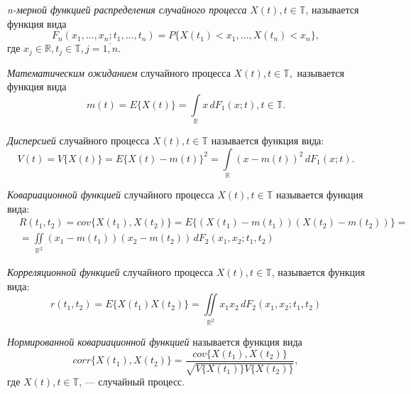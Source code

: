 \begin{Definition}
\label{def:distr_func}
	\textit{n-мерной функцией распределения случайного процесса} $ X(t), t \in \mathbb{T} $, называется функция вида
	\begin{equation*}
		F_n(x_1, \dots, x_n; t_1, \dots, t_n) = P \{ X(t_1) < x_1, \dots, X(t_n) < x_n \},
	\end{equation*}
	где $ x_j \in \mathbb{R}, t_j \in \mathbb{T}, j = \overline{1,n} $.
\end{Definition}

\begin{Definition}
	\textit{Математическим ожиданием} случайного процесса $ X(t), t \in \mathbb{T}, $ называется функция вида
	\begin{equation*}
		m(t) = E \{ X(t) \} = \int \limits_{\mathbb{R}} x \, dF_1(x;t), t \in \mathbb{T}.
	\end{equation*}
\end{Definition}

\begin{Definition}
	\textit{Дисперсией} случайного процесса $ X(t), t \in \mathbb{T} $ называется функция вида:
	\begin{equation*}
		V(t) = V \{ X(t) \} = E \{ X(t) - m(t) \}^2 = \int \limits_{\mathbb{R}} (x - m(t))^2 \, dF_1(x; t).
	\end{equation*}
\end{Definition}

\begin{Definition}
	\textit{Ковариационной функцией} случайного процесса $ X(t), t \in \mathbb{T} $ называется функция вида:
	\begin{eqnarray*}
		& R(t_1, t_2) = cov\{ X(t_1), X(t_2) \} = E \{ (X(t_1) - m(t_1)) (X(t_2) - m(t_2)) \} = \\
		& = \iint \limits_{\mathbb{R}^2} (x_1 - m(t_1)) (x_2 - m(t_2)) \, dF_2(x_1, x_2; t_1, t_2)
	\end{eqnarray*}
\end{Definition}

\begin{Definition}
	\textit{Корреляционной функцией} случайного процесса $ X(t), t \in \mathbb{T} $, называется функция вида:
	\begin{equation*}
		r(t_1, t_2) = E \{ X(t_1)X(t_2) \} = \iint \limits_{\mathbb{R}^2} x_1 x_2 \, dF_2(x_1, x_2; t_1, t_2)
	\end{equation*}
\end{Definition}

\begin{Definition}
\label{def:corr_cov}
	\textit{Нормированной ковариационной функцией} называется функция вида
	\begin{equation*}
		corr\{ X(t_1), X(t_2)\} = \frac{cov\{ X(t_1), X(t_2) \}}{\sqrt{ V\{ X(t_1) \} V\{ X(t_2) \} }},
	\end{equation*}
	где $ X(t), t \in \mathbb{T} $, --- случайный процесс.
\end{Definition}

